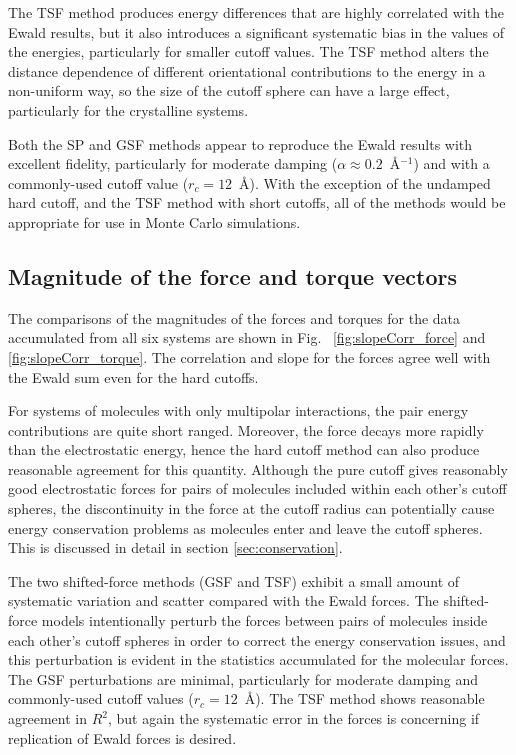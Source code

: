 The TSF method produces energy differences that are highly correlated
with the Ewald results, but it also introduces a significant
systematic bias in the values of the energies, particularly for
smaller cutoff values. The TSF method alters the distance dependence
of different orientational contributions to the energy in a
non-uniform way, so the size of the cutoff sphere can have a large
effect, particularly for the crystalline systems.

Both the SP and GSF methods appear to reproduce the Ewald results with
excellent fidelity, particularly for moderate damping ($\alpha \approx
0.2$~\AA$^{-1}$) and with a commonly-used cutoff value ($r_c =
12$~\AA).  With the exception of the undamped hard cutoff, and the TSF
method with short cutoffs, all of the methods would be appropriate for
use in Monte Carlo simulations.
\subsection{Magnitude of the force and torque vectors}

The comparisons of the magnitudes of the forces and torques for the
data accumulated from all six systems are shown in Fig.
~\ref{fig:slopeCorr_force} and \ref{fig:slopeCorr_torque}. The
correlation and slope for the forces agree well with the Ewald sum
even for the hard cutoffs.

For systems of molecules with only multipolar interactions, the pair
energy contributions are quite short ranged.  Moreover, the force
decays more rapidly than the electrostatic energy, hence the hard
cutoff method can also produce reasonable agreement for this quantity.
Although the pure cutoff gives reasonably good electrostatic forces
for pairs of molecules included within each other's cutoff spheres,
the discontinuity in the force at the cutoff radius can potentially
cause energy conservation problems as molecules enter and leave the
cutoff spheres.  This is discussed in detail in section
\ref{sec:conservation}.

The two shifted-force methods (GSF and TSF) exhibit a small amount of
systematic variation and scatter compared with the Ewald forces.  The
shifted-force models intentionally perturb the forces between pairs of
molecules inside each other's cutoff spheres in order to correct the
energy conservation issues, and this perturbation is evident in the
statistics accumulated for the molecular forces.  The GSF
perturbations are minimal, particularly for moderate damping and
commonly-used cutoff values ($r_c = 12$~\AA).  The TSF method shows
reasonable agreement in $R^2$, but again the systematic error in the
forces is concerning if replication of Ewald forces is desired.

